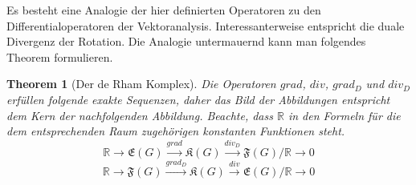 \documentclass[11pt,a4paper,leqno]{report}
\newtheorem{theorem}{Theorem}[chapter]
\numberwithin{equation}{chapter}
\begin{document}
\noindent
	Es besteht eine Analogie der hier definierten Operatoren zu den Differential\-operatoren der Vektoranalysis. Interessanterweise entspricht die duale Divergenz der Rotation. Die Analogie untermauernd kann man folgendes Theorem formulieren.
\begin{theorem}[Der de Rham Komplex]
	Die Operatoren $grad$, $div$, $grad_D$ und $div_D$ erf\"ullen folgende exakte Sequenzen, daher das Bild der Abbildungen entspricht dem Kern der nachfolgenden Abbildung. Beachte, dass $\mathbb{R}$ in den Formeln f\"ur die dem entsprechenden Raum zugeh\"origen konstanten Funktionen steht.
\begin{equation}
	\mathbb{R}\longrightarrow\mathfrak{E}(G) \overset{grad}{\longrightarrow}\mathfrak{K}(G) \overset{div_D}{\longrightarrow}\mathfrak{F}(G)/\mathbb{R}\longrightarrow 0
\end{equation}
\begin{equation}
	\mathbb{R}\longrightarrow\mathfrak{F}(G) \overset{grad_D}{\longrightarrow}\mathfrak{K}(G) \overset{div}{\longrightarrow}\mathfrak{E}(G)/\mathbb{R}\longrightarrow 0
\end{equation}
\end{theorem}
\end{document}
